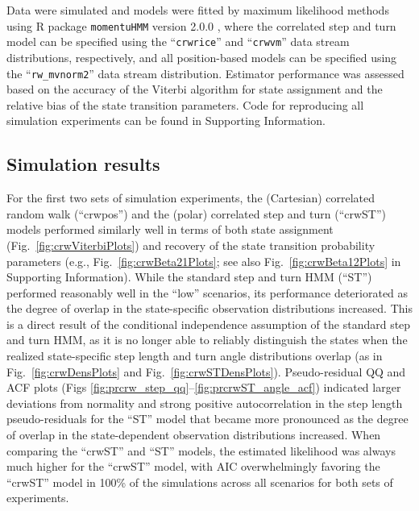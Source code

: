 \documentclass[12pt]{article}\usepackage[]{graphicx}\usepackage[]{xcolor}
\begin{document}
Data were simulated and models were fitted by maximum likelihood methods using R package \verb|momentuHMM| version 2.0.0 \citep{McClintockMichelot2018}, where the correlated step and turn model can be specified using the ``\verb|crwrice|'' and ``\verb|crwvm|'' data stream distributions, respectively, and all position-based models can be specified using the ``\verb|rw_mvnorm2|'' data stream distribution. Estimator performance was assessed based on the accuracy of the Viterbi algorithm for state assignment \citep[e.g.,][]{ZucchiniEtAl2016} and the relative bias of the state transition parameters. Code for reproducing all simulation experiments can be found in Supporting Information.

\subsection{Simulation results}
For the first two sets of simulation experiments, the (Cartesian) correlated random walk (``crwpos'') and the (polar) correlated step and turn (``crwST'') models performed similarly well in terms of both state assignment (Fig.\ \ref{fig:crwViterbiPlots}) and recovery of the state transition probability parameters (e.g., Fig.\ \ref{fig:crwBeta21Plots}; see also Fig.\ \ref{fig:crwBeta12Plots} in Supporting Information). While the standard step and turn HMM (``ST'') performed reasonably well in the ``low'' scenarios, its performance deteriorated as the degree of overlap in the state-specific observation distributions increased. This is a direct result of the conditional independence assumption of the standard step and turn HMM, as it is no longer able to reliably distinguish the states when the realized state-specific step length and turn angle distributions overlap (as in Fig.\ \ref{fig:crwDensPlots} and Fig.\ \ref{fig:crwSTDensPlots}). Pseudo-residual QQ and ACF plots (Figs \ref{fig:prcrw_step_qq}--\ref{fig:prcrwST_angle_acf}) indicated larger deviations from normality and strong positive autocorrelation in the step length pseudo-residuals for the ``ST'' model that became more pronounced as the degree of overlap in the state-dependent observation distributions increased. When comparing the ``crwST'' and ``ST'' models, the estimated likelihood was always much higher for the ``crwST'' model, with AIC overwhelmingly favoring the ``crwST'' model in 100\% of the simulations across all scenarios for both sets of experiments.
\end{document}
